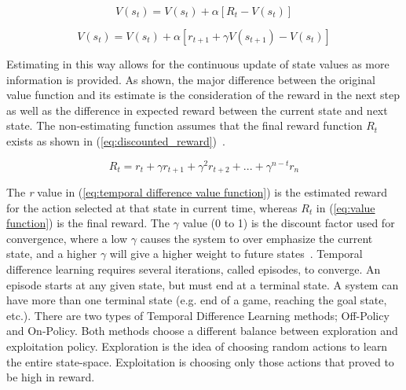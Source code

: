 \documentclass[12pt,american]{report}
\begin{document}
        \begin{equation}
            \label{eq:value function}
            V(s_{t}) = V(s_{t}) + \alpha[R_{t}-V(s_{t})]
        \end{equation}

        \begin{equation}
            \label{eq:temporal difference value function}
            V(s_{t}) = V(s_{t}) + \alpha[r_{t+1} + \gamma V(s_{t+1})-V(s_{t})]
        \end{equation}

        Estimating in this way allows for the continuous update of state values as more information is provided. As shown, the major difference between the original value function and its estimate is the consideration of the reward in the next step as well as the difference in expected reward between the current state and next state. The non-estimating function assumes that the final reward function \textit{$R_{t}$} exists as shown in (\ref{eq:discounted_reward})~\cite{matiisen_2015}.

        \begin{equation}
            \label{eq:discounted_reward}
            R_{t} = r_t + \gamma r_{t+1} + \gamma^2 r_{t+2} + ... + \gamma^{n-t}r_n 
        \end{equation}

        The \textit{r} value in (\ref{eq:temporal difference value function}) is the estimated reward for the action selected at that state in current time, whereas \textit{$R_t$} in (\ref{eq:value function}) is the final reward.  The \begin{math}\gamma\end{math} value (0 to 1) is the discount factor used for convergence, where a low \begin{math}\gamma\end{math} causes the system to over emphasize the current state, and a higher \begin{math}\gamma\end{math} will give a higher weight to future states~\cite{Eden}. Temporal difference learning requires several iterations, called episodes, to converge. An episode starts at any given state, but must end at a terminal state.  A system can have more than one terminal state (e.g. end of a game, reaching the goal state, etc.). There are two types of Temporal Difference Learning methods; Off-Policy and On-Policy.  Both methods choose a different balance between exploration and exploitation policy.  Exploration is the idea of choosing random actions to learn the entire state-space.  Exploitation is choosing only those actions that proved to be high in reward.
\end{document}
